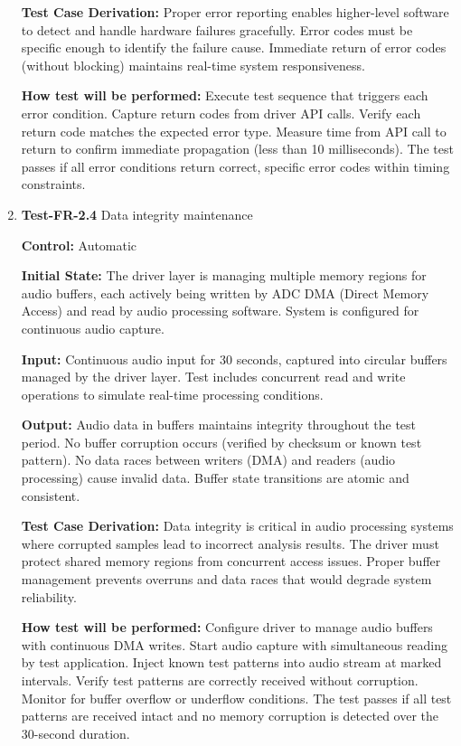 \documentclass[12pt, titlepage]{article}
\begin{document}
\begin{enumerate}
\textbf{Test Case Derivation:} 
Proper error reporting enables higher-level software to detect and handle
hardware failures gracefully. Error codes must be specific enough to identify
the failure cause. Immediate return of error codes (without blocking) maintains
real-time system responsiveness.
					
\textbf{How test will be performed:}
Execute test sequence that triggers each error condition. Capture return codes
from driver API calls. Verify each return code matches the expected error type.
Measure time from API call to return to confirm immediate propagation (less than
10 milliseconds). The test passes if all error conditions return correct,
specific error codes within timing constraints.

\item{\textbf{Test-FR-2.4} Data integrity maintenance\\}

\textbf{Control:} Automatic
					
\textbf{Initial State:} 
The driver layer is managing multiple memory regions for audio buffers, each
actively being written by ADC DMA (Direct Memory Access) and read by audio
processing software. System is configured for continuous audio capture.
					
\textbf{Input:}
Continuous audio input for 30 seconds, captured into circular buffers managed by
the driver layer. Test includes concurrent read and write operations to simulate
real-time processing conditions.
					
\textbf{Output:}
Audio data in buffers maintains integrity throughout the test period. No buffer
corruption occurs (verified by checksum or known test pattern). No data races
between writers (DMA) and readers (audio processing) cause invalid data. Buffer
state transitions are atomic and consistent.

\textbf{Test Case Derivation:} 
Data integrity is critical in audio processing systems where corrupted samples
lead to incorrect analysis results. The driver must protect shared memory
regions from concurrent access issues. Proper buffer management prevents
overruns and data races that would degrade system reliability.
					
\textbf{How test will be performed:}
Configure driver to manage audio buffers with continuous DMA writes. Start audio
capture with simultaneous reading by test application. Inject known test
patterns into audio stream at marked intervals. Verify test patterns are
correctly received without corruption. Monitor for buffer overflow or underflow
conditions. The test passes if all test patterns are received intact and no
memory corruption is detected over the 30-second duration.

\end{enumerate}
\end{document}
